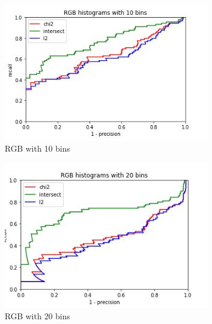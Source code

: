 \documentclass[
	12pt, %
]{fphw}
\begin{document}
\begin{figure}[h!]
     \centering
     \begin{subfigure}[b]{0.3\textwidth}
         \centering
         \includegraphics[width=\textwidth]{img/plots/RGB_10.JPG}
         \caption{RGB with 10 bins}
         \label{fig:y equals x}
     \end{subfigure}
     \hfill
     \begin{subfigure}[b]{0.3\textwidth}
         \centering
         \includegraphics[width=\textwidth]{img/plots/RGB_20.JPG}
         \caption{RGB with 20 bins}
         \label{fig:three sin x}
     \end{subfigure}
     \hfill
     \begin{subfigure}[b]{0.3\textwidth}
         \centering

\end{subfigure}
\end{figure}
\end{document}
